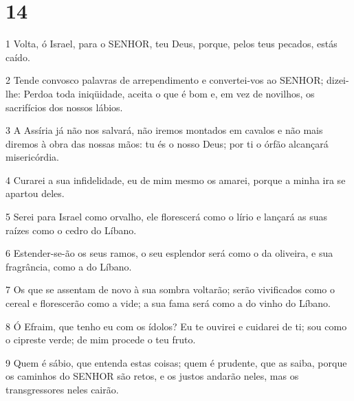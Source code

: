 \chapter{14}

\par 1 Volta, ó Israel, para o SENHOR, teu Deus, porque, pelos teus pecados, estás caído.
\par 2 Tende convosco palavras de arrependimento e convertei-vos ao SENHOR; dizei-lhe: Perdoa toda iniqüidade, aceita o que é bom e, em vez de novilhos, os sacrifícios dos nossos lábios.
\par 3 A Assíria já não nos salvará, não iremos montados em cavalos e não mais diremos à obra das nossas mãos: tu és o nosso Deus; por ti o órfão alcançará misericórdia.
\par 4 Curarei a sua infidelidade, eu de mim mesmo os amarei, porque a minha ira se apartou deles.
\par 5 Serei para Israel como orvalho, ele florescerá como o lírio e lançará as suas raízes como o cedro do Líbano.
\par 6 Estender-se-ão os seus ramos, o seu esplendor será como o da oliveira, e sua fragrância, como a do Líbano.
\par 7 Os que se assentam de novo à sua sombra voltarão; serão vivificados como o cereal e florescerão como a vide; a sua fama será como a do vinho do Líbano.
\par 8 Ó Efraim, que tenho eu com os ídolos? Eu te ouvirei e cuidarei de ti; sou como o cipreste verde; de mim procede o teu fruto.
\par 9 Quem é sábio, que entenda estas coisas; quem é prudente, que as saiba, porque os caminhos do SENHOR são retos, e os justos andarão neles, mas os transgressores neles cairão.


